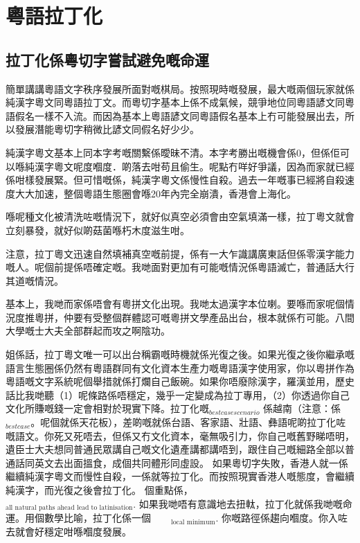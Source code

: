 \chapter{粵語拉丁化}

\section{拉丁化係粵切字嘗試避免嘅命運}

簡單講講粵語文字秩序發展所面對嘅棋局。按照現時嘅發展，最大嘅兩個玩家就係純漢字粵文同粵語拉丁文。而粵切字基本上係不成氣候，競爭地位同粵語諺文同粵語假名一樣不入流。而因為基本上粵語諺文同粵語假名基本上冇可能發展出去，所以發展潛能粵切字稍微比諺文同假名好少少。

純漢字粵文基本上同本字考嘅關繫係曖昧不清。本字考勝出嘅機會係0，但係佢可以喺純漢字粵文呢度嗰度．啲落去咁苟且偷生。呢點冇咩好爭議，因為而家就已經係咁樣發展緊。但可惜嘅係，純漢字粵文係慢性自殺。過去一年嘅事已經將自殺速度大大加速，整個粵語生態圈會喺20年內完全崩潰，香港會上海化。

喺呢種文化被清洗咗嘅情況下，就好似真空必須會由空氣填滿一樣，拉丁粵文就會立刻暴發，就好似啲菇菌喺朽木度滋生咁。

注意，拉丁粵文迅速自然填補真空嘅前提，係有一大乍識講廣東話但係零漢字能力嘅人。呢個前提係唔確定嘅。我哋面對更加有可能嘅情況係粵語滅亡，普通話大行其道嘅情況。

基本上，我哋而家係唔會有粵拼文化出現。我哋太過漢字本位喇。要喺而家呢個情況度推粵拼，仲要有受整個群體認可嘅粵拼文學產品出台，根本就係冇可能。八間大學嘅士大夫全部群起而攻之啊陰功。

姐係話，拉丁粵文唯一可以出台稱霸嘅時機就係光復之後。如果光復之後你繼承嘅語言生態圈係仍然有粵語群同有文化資本生產力嘅粵語漢字使用家，你以粵拼作為粵語嘅文字系統呢個舉措就係打爛自己飯碗。如果你唔廢除漢字，羅漢並用，歷史話比我哋聽（1）呢條路係唔穩定，幾乎一定變成為拉丁專用，（2）你透過你自己文化所賺嘅錢一定會相對於現實下降。拉丁化嘅$_{best case scenario}$ 係越南（注意：係 $_{best case}$。呢個就係天花板），差啲嘅就係台語、客家語、壯語、彝語呢啲拉丁化咗嘅語文。你死又死唔去，但係又冇文化資本，毫無吸引力，你自己嘅舊野睇唔明，遺臣士大夫想同普通民眾講自己嘅文化遺產講都講唔到，跟住自己嘅細路全部以普通話同英文去出面搵食，成個共同體形同虛設。
如果粵切字失敗，香港人就一係繼續純漢字粵文而慢性自殺，一係就等拉丁化。而按照現實香港人嘅態度，會繼續純漢字，而光復之後會拉丁化。
個重點係，     $_{\text{all natural paths ahead lead to latinisation}}$. 如果我哋唔有意識地去扭軚，拉丁化就係我哋嘅命運。用個數學比喻，拉丁化係一個  $_{\text{local minimum}}$. 你嘅路徑係趨向嗰度。你入咗去就會好穩定咁喺嗰度發展。


